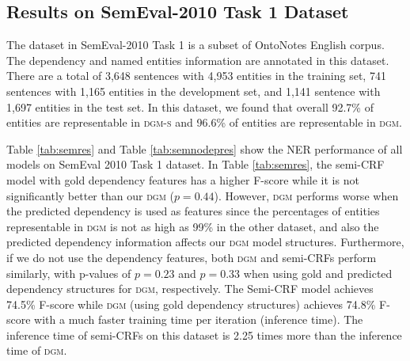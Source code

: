 \subsection{Results on SemEval-2010 Task 1 Dataset}

The dataset in SemEval-2010 Task 1 is a subset of OntoNotes English corpus. The dependency and named entities information are annotated in this dataset. 
There are a total of 3,648 sentences with 4,953 entities in the training set, 741 sentences with 1,165 entities in the development set, and 1,141 sentence with 1,697 entities in the test set. 
In this dataset, we found that overall 92.7\% of entities are representable in \textsc{dgm-s} and 96.6\% of entities are representable in \textsc{dgm}. 

Table \ref{tab:semres} and Table \ref{tab:semnodepres} show the NER performance of all models on SemEval 2010 Task 1 dataset. In Table \ref{tab:semres}, the semi-CRF model with gold dependency features has a higher F-score while it is not significantly better than our \textsc{dgm} ($p=0.44$). 
However, \textsc{dgm} performs worse when the predicted dependency is used as features since the percentages of entities representable in \textsc{dgm} is not as high as 99\% in the other dataset, and also the predicted dependency information affects our \textsc{dgm} model structures. Furthermore, if we do not use the dependency features, both \textsc{dgm} and semi-CRFs perform similarly, with p-values of $p=0.23$ and $p=0.33$ when using gold and predicted dependency structures for \textsc{dgm}, respectively. The Semi-CRF model achieves 74.5\% F-score while \textsc{dgm} (using gold dependency structures) achieves 74.8\% F-score with a much faster training time per iteration (inference time). The inference time of semi-CRFs on this dataset is 2.25 times more than the inference time of \textsc{dgm}. 
